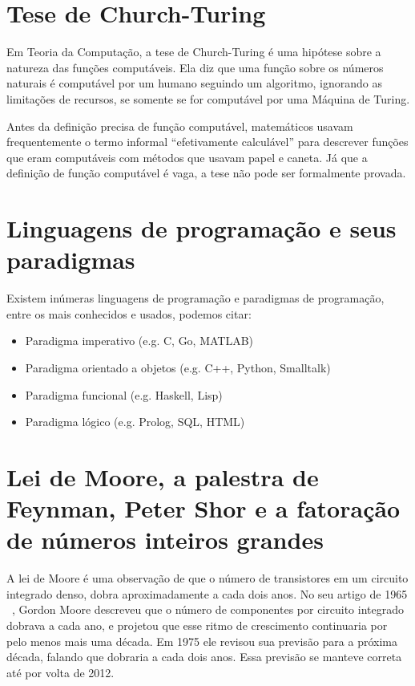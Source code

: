 \documentclass[letterpaper,twocolumn,10pt]{article}
\begin{document}
\section{Tese de Church-Turing}

Em Teoria da Computação, a tese de Church-Turing é uma hipótese sobre a
natureza das funções computáveis. Ela diz que uma função sobre os números
naturais é computável por um humano seguindo um algoritmo, ignorando as
limitações de recursos, se somente se for computável por uma Máquina de Turing.

Antes da definição precisa de função computável, matemáticos usavam
frequentemente o termo informal ``efetivamente calculável'' para descrever
funções que eram computáveis com métodos que usavam papel e caneta. Já que a
definição de função computável é vaga, a tese não pode ser formalmente provada.

\section{Linguagens de programação e seus paradigmas}

Existem inúmeras linguagens de programação e paradigmas de programação, entre
os mais conhecidos e usados, podemos citar:

\begin{itemize}
	\item Paradigma imperativo (e.g. C, Go, MATLAB)
	\item Paradigma orientado a objetos (e.g. C++, Python, Smalltalk)
	\item Paradigma funcional (e.g. Haskell, Lisp)
	\item Paradigma lógico (e.g. Prolog, SQL, HTML)
\end{itemize}

\section{Lei de Moore, a palestra de Feynman, Peter Shor e a fatoração de
números inteiros grandes}

A lei de Moore é uma observação de que o número de transistores em um circuito
integrado denso, dobra aproximadamente a cada dois anos. No seu artigo de 1965
~\cite{Moore}, Gordon Moore descreveu que o número de componentes por circuito
integrado dobrava a cada ano, e projetou que esse ritmo de crescimento
continuaria por pelo menos mais uma década. Em 1975 ele revisou sua previsão
para a próxima década, falando que dobraria a cada dois anos. Essa previsão se
manteve correta até por volta de 2012.
\end{document}
